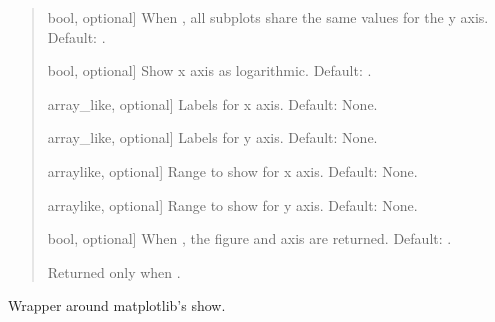 \documentclass[letterpaper,10pt,english]{sphinxmanual}
\begin{document}
\begin{fulllineitems}
\begin{quote}
\begin{description}
\begin{description}
\sphinxlineitem{\sphinxstylestrong{sharey}}{[}bool, optional{]}
\sphinxAtStartPar
When , all subplots share the same values for the y axis.
Default: .

\sphinxlineitem{\sphinxstylestrong{log}}{[}bool, optional{]}
\sphinxAtStartPar
Show x axis as logarithmic. Default: .

\sphinxlineitem{\sphinxstylestrong{xlabels}}{[}array\_like, optional{]}
\sphinxAtStartPar
Labels for x axis. Default: None.

\sphinxlineitem{\sphinxstylestrong{ylabels}}{[}array\_like, optional{]}
\sphinxAtStartPar
Labels for y axis. Default: None.

\sphinxlineitem{\sphinxstylestrong{range\_x}}{[}array\sphinxhyphen{}like, optional{]}
\sphinxAtStartPar
Range to show for x axis. Default: None.

\sphinxlineitem{\sphinxstylestrong{range\_y}}{[}array\sphinxhyphen{}like, optional{]}
\sphinxAtStartPar
Range to show for y axis. Default: None.

\sphinxlineitem{\sphinxstylestrong{returns}}{[}bool, optional{]}
\sphinxAtStartPar
When , the figure and axis are returned. Default: .

\end{description}

\begin{description}
\sphinxAtStartPar
Returned only when .

\end{description}

\end{description}\end{quote}

\end{fulllineitems}


\begin{fulllineitems}
\label{\detokenize{modules/dsptoolbox.plots:dsptoolbox.plots.show}}
\pysigstartsignatures
{}
\pysigstopsignatures
\sphinxAtStartPar
Wrapper around matplotlib’s show.

\end{fulllineitems}
\end{document}
